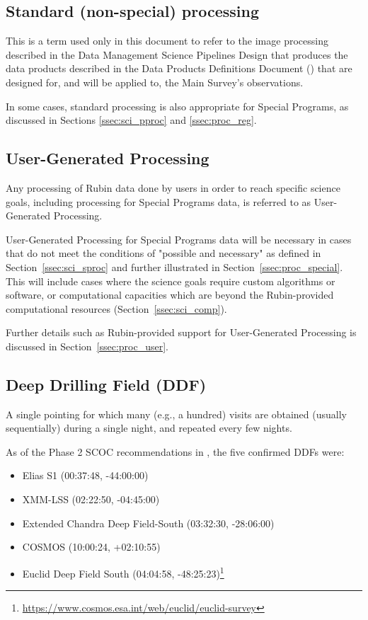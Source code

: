 \subsection{Standard (non-special) processing}\label{ssec:intro_stdproc}

This is a term used only in this document to refer to the image processing 
described in the Data Management Science Pipelines Design 
that produces the data products described in the Data Products Definitions Document
() that are designed for, and will be applied to, the Main Survey's observations.

In some cases, standard processing is also appropriate for Special Programs,
as discussed in Sections \ref{ssec:sci_pproc} and \ref{ssec:proc_reg}.

\subsection{User-Generated Processing}

Any processing of Rubin data done by users in order to reach specific science goals, including
processing for Special Programs data, is referred to as User-Generated Processing.

User-Generated Processing for Special Programs data will be necessary in cases that
do not meet the conditions of "possible and necessary" as defined in
Section~\ref{ssec:sci_sproc} and further illustrated in Section~\ref{ssec:proc_special}.
This will include cases where the science goals require custom algorithms or software,
or computational capacities which are beyond the Rubin-provided
computational resources (Section~\ref{ssec:sci_comp}).

Further details such as Rubin-provided support for User-Generated Processing is discussed
in Section~\ref{ssec:proc_user}.

\subsection{Deep Drilling Field (DDF)}

A single pointing for which many (e.g., a hundred) visits are obtained 
(usually sequentially) during a single night, and repeated every few 
nights.

As of the Phase 2 SCOC recommendations in , the five 
confirmed DDFs were:

\begin{itemize}
\item Elias S1 (00:37:48, -44:00:00)
\item XMM-LSS (02:22:50, -04:45:00)
\item Extended Chandra Deep Field-South (03:32:30, -28:06:00)
\item COSMOS (10:00:24, +02:10:55)
\item Euclid Deep Field South  (04:04:58, -48:25:23)\footnote{\url{https://www.cosmos.esa.int/web/euclid/euclid-survey}}
\end{itemize}

